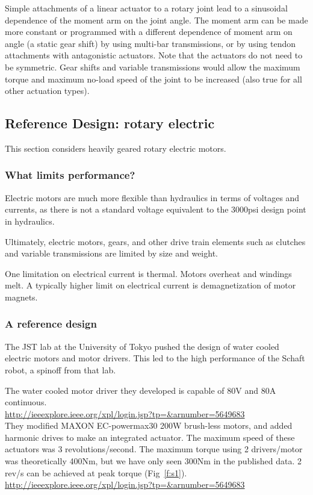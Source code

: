 \documentclass[letterpaper,12pt,fullpage]{article}
\begin{document}
Simple attachments of a linear actuator to a rotary joint lead to
a sinusoidal dependence of the moment arm on the joint angle.
The moment arm can be made more constant or programmed with
a different dependence of moment arm on angle (a static gear shift)
by using multi-bar transmissions,
or by using tendon attachments with antagonistic actuators.
Note that the actuators do not need to be symmetric.
Gear shifts and variable transmissions would allow the maximum torque
and maximum no-load speed of the joint to be increased (also true
for all other actuation types).

\subsection{Reference Design: rotary electric}

This section considers heavily geared rotary electric motors.

\subsubsection{What limits performance?}

Electric motors are much more flexible than hydraulics in terms of voltages
and currents, as there is not a standard voltage equivalent to the 3000psi
design point in hydraulics.

Ultimately, electric motors, gears, and other drive train elements such
as clutches and variable transmissions are limited by size and weight.

One limitation on electrical current
is thermal. Motors overheat and windings melt.
A typically 
higher limit on electrical current is demagnetization of motor magnets.

\subsubsection{A reference design}

The JST lab at the University of Tokyo pushed the design of water
cooled electric motors and motor drivers. This led to the high
performance of the Schaft robot, a spinoff from that lab.

The water cooled motor driver they developed is capable of 80V and
80A continuous.\\
\url{http://ieeexplore.ieee.org/xpl/login.jsp?tp=&arnumber=5649683}\\

They modified
MAXON EC-powermax30 200W brush-less motors, and added harmonic drives
to make an integrated actuator.
The maximum speed of these actuators was 3 revolutions/second.
The maximum torque using 2 drivers/motor was theoretically 400Nm, but
we have only seen 300Nm in the published data. 2 rev/s can be achieved
at peak torque (Fig~\ref{f:s1}).\\
\url{http://ieeexplore.ieee.org/xpl/login.jsp?tp=&arnumber=5649683}\\
\end{document}
